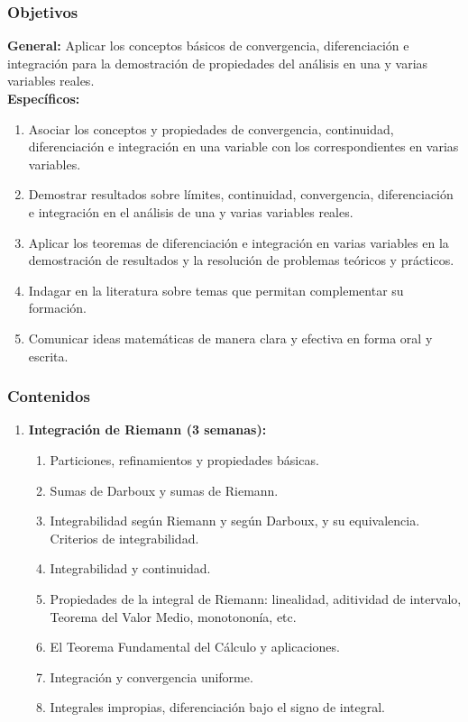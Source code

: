 \begin{refsection}
\subsubsection*{Objetivos}

\textbf{General:} Aplicar los conceptos básicos de convergencia, diferenciación e integración para la demostración de propiedades del análisis en una y varias variables reales. \\

\textbf{Específicos:}

\begin{enumerate}
\item Asociar los conceptos y propiedades de convergencia, continuidad, diferenciación e integración en una variable con los correspondientes en varias variables.
\item Demostrar resultados sobre límites, continuidad, convergencia, diferenciación e integración en el análisis de una y varias variables reales.
\item Aplicar los teoremas de diferenciación e integración en varias variables en la demostración de resultados y la resolución de problemas teóricos y prácticos.
\item Indagar en la literatura sobre temas que permitan complementar su formación.
\item Comunicar ideas matemáticas de manera clara y efectiva en forma oral y escrita.
\end{enumerate}

\subsubsection*{Contenidos}

\begin{enumerate}
\item \textbf{Integración de Riemann (3 semanas):} 
\begin{enumerate}
    \item Particiones, refinamientos y propiedades básicas.
    \item Sumas de Darboux y sumas de Riemann.
    \item Integrabilidad según Riemann y según Darboux, y su equivalencia. Criterios de integrabilidad.
    \item Integrabilidad y continuidad.
    \item Propiedades de la integral de Riemann: linealidad, aditividad de intervalo, Teorema del Valor Medio, monotononía, etc. 
    \item El Teorema Fundamental del Cálculo y aplicaciones. 
    \item Integración y convergencia uniforme.
    \item Integrales impropias, diferenciación bajo el signo de integral.
\end{enumerate}


\end{enumerate}
\end{refsection}

